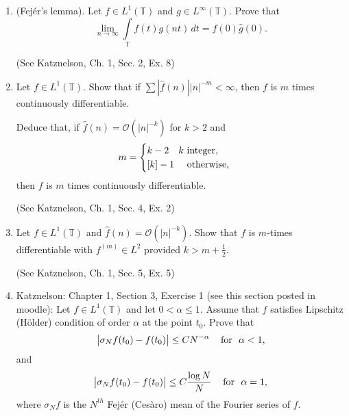 \documentclass[12pt]{article}
\begin{document}
\begin{enumerate}
\begin{enumerate}[(a)]
\begin{solution}
\begin{enumerate}
    \item

    \item

    \item
  \end{enumerate}<++>

\end{solution}

\end{enumerate}

\item (Fej\'er's lemma). Let $f \in L^1 (\mathbb T) $ and $g \in L^\infty (\mathbb T)$. Prove that $$\lim_{n \rightarrow \infty }  \int\limits_{\mathbb T} f(t ) g (nt) \,dt  = \widehat{f} (0) \widehat{g} (0).$$

(See Katznelson, Ch. 1, Sec. 2, Ex. 8)


\item  Let $f \in L^1 (\mathbb T)$. Show that if $\sum | \widehat{f} (n) | |n|^{-m} < \infty$, then $f$ is $m$ times continuously differentiable.

Deduce that, if $\widehat{f} (n ) = \mathcal O (|n|^{-k})$ for $k>2$ and $$ m = \begin{cases} k-2 \quad k \textup{ integer, } \\ [k]-1 \quad \textup{ otherwise, } \end{cases}$$ then $f$ is $m$ times continuously differentiable.

(See Katznelson, Ch. 1, Sec. 4, Ex. 2)

\item Let $f \in L^1 (\mathbb T)$ and $ \widehat{f} (n ) = \mathcal O (|n|^{-k})$. Show that $f$ is $m$-times  differentiable with $f^{(m)} \in L^2$ provided $k> m +\frac12$.

(See Katznelson, Ch. 1, Sec. 5, Ex. 5)

\item Katznelson: Chapter 1, Section 3, Exercise 1 (see this section posted in moodle): Let $f \in L^ 1(\mathbb T)$ and let $0< \alpha \le1$. Assume that $f$ satisfies Lipschitz (H\"older) condition of order $\alpha$ at the point $t_0$. Prove that
$$ \big| \sigma_N f (t_0)   - f(t_0) \big| \le C N^{-\alpha} \,\,\,\,\, \textup{ for } \,\, \alpha<1,$$
and
$$ \big| \sigma_N f (t_0)   - f(t_0) \big| \le C \frac{\log N}{N} \,\,\,\,\, \textup{ for } \,\, \alpha=1,$$
where $\sigma_N f $ is the $N^{th}$ Fej\'er (Ces\`aro) mean of the Fourier series of $f$.

\end{enumerate}
\end{document}
